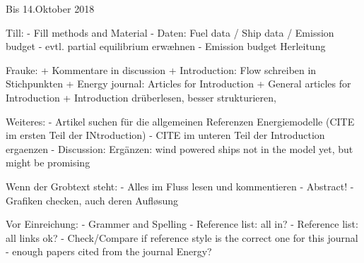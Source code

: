Bis 14.Oktober 2018

Till:
- Fill methods and Material
- Daten: Fuel data / Ship data / Emission budget
- evtl. partial equilibrium erwæhnen
- Emission budget Herleitung

Frauke:
+ Kommentare in discussion
+ Introduction: Flow schreiben in Stichpunkten
+ Energy journal: Articles for Introduction
+ General articles for Introduction
+ Introduction drüberlesen, besser strukturieren, 

Weiteres:
- Artikel suchen für die allgemeinen Referenzen Energiemodelle (CITE im ersten Teil der INtroduction)
- CITE im unteren Teil der Introduction ergaenzen
- Discussion: Ergänzen: wind powered ships not in the model yet, but might be promising

Wenn der Grobtext steht:
- Alles im Fluss lesen und kommentieren
- Abstract!
- Grafiken checken, auch deren Aufløsung


Vor Einreichung:
- Grammer and Spelling
- Reference list: all in?
- Reference list: all links ok?
- Check/Compare if reference style is the correct one for this journal
- enough papers cited from the journal Energy?

